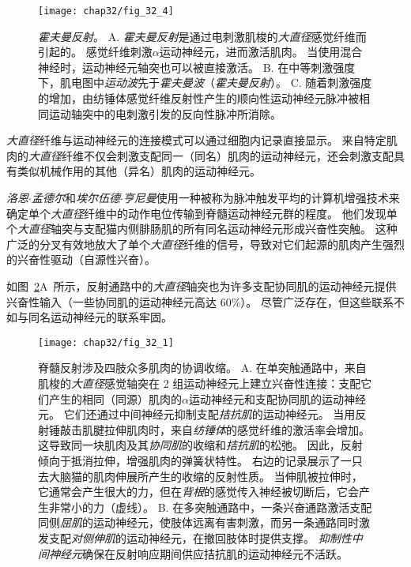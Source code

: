 \begin{figure}[htbp]
	\centering
	\texttt{[image: chap32/fig\_32\_4]}
	\caption{\textit{霍夫曼反射}。
		A. \textit{霍夫曼反射}是通过电刺激肌梭的\textit{大直径}感觉纤维而引起的。
		感觉纤维刺激$\alpha$运动神经元，进而激活肌肉。
		当使用混合神经时，运动神经元轴突也可以被直接激活。
		B. 在中等刺激强度下，肌电图中\textit{运动波}先于\textit{霍夫曼波}（\textit{霍夫曼反射}）。
		C. 随着刺激强度的增加，由纺锤体感觉纤维反射性产生的顺向性运动神经元脉冲被相同运动轴突中的电刺激引发的反向性脉冲所消除。}
	\label{fig:32_4}
\end{figure}


\textit{大直径}纤维与运动神经元的连接模式可以通过细胞内记录直接显示。
来自特定肌肉的\textit{大直径}纤维不仅会刺激支配同一（同名）肌肉的运动神经元，还会刺激支配具有类似机械作用的其他（异名）肌肉的运动神经元。


\textit{洛恩$\cdot$孟德尔}和\textit{埃尔伍德$\cdot$亨尼曼}使用一种被称为脉冲触发平均的计算机增强技术来确定单个\textit{大直径}纤维中的动作电位传输到脊髓运动神经元群的程度。
他们发现单个\textit{大直径}轴突与支配猫内侧腓肠肌的所有同名运动神经元形成兴奋性突触。
这种广泛的分叉有效地放大了单个\textit{大直径}纤维的信号，导致对它们起源的肌肉产生强烈的兴奋性驱动（自源性兴奋）。


如图~\ref{fig:32_1}A~所示，反射通路中的\textit{大直径}轴突也为许多支配协同肌的运动神经元提供兴奋性输入（一些协同肌的运动神经元高达 60\%）。 
尽管广泛存在，但这些联系不如与同名运动神经元的联系牢固。


\begin{figure}[htbp]
	\centering
	\texttt{[image: chap32/fig\_32\_1]}
	\caption{脊髓反射涉及四肢众多肌肉的协调收缩。
		A. 在单突触通路中，来自肌梭的\textit{大直径}感觉轴突在 2 组运动神经元上建立兴奋性连接：支配它们产生的相同（同源）肌肉的$ \alpha $运动神经元和支配协同肌的运动神经元。
		它们还通过中间神经元抑制支配\textit{拮抗肌}的运动神经元。
		当用反射锤敲击肌腱拉伸肌肉时，来自\textit{纺锤体}的感觉纤维的激活率会增加。
		这导致同一块肌肉及其\textit{协同肌}的收缩和\textit{拮抗肌}的松弛。
		因此，反射倾向于抵消拉伸，增强肌肉的弹簧状特性。
		右边的记录展示了一只去大脑猫的肌肉伸展所产生的收缩的反射性质。
		当伸肌被拉伸时，它通常会产生很大的力，但在\textit{背根}的感觉传入神经被切断后，它会产生非常小的力（虚线）\cite{liddell1924reflexes}。
		B. 在多突触通路中，一条兴奋通路激活支配同侧\textit{屈肌}的运动神经元，使肢体远离有害刺激，而另一条通路同时激发支配\textit{对侧伸肌}的运动神经元，在撤回肢体时提供支撑。
		\textit{抑制性中间神经元}确保在反射响应期间供应拮抗肌的运动神经元不活跃\cite{schmidt1989motor}。}
	\label{fig:32_1}
\end{figure}


